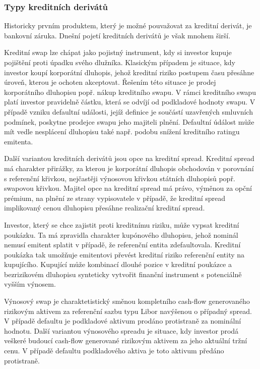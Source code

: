 \documentclass[a4paper]{book}
\begin{document}
\subsubsection{Typy kreditních derivátů}

Historicky prvním produktem, který je možné pouvažovat za kreditní derivát, je bankovní záruka. Dnešní pojetí kreditních derivátů je však mnohem širší.

Kreditní swap lze chápat jako pojistný instrument, kdy si investor kupuje pojištění proti úpadku svého dlužníka. Klasickým případem je situace, kdy investor koupí korporátní dluhopis, jehož kreditní riziko postupem času přesáhne úroveň, kterou je ochoten akceptovat. Řešením této situace je prodej korporátního dluhopisu popř. nákup kreditního swapu. V rámci kreditního swapu platí investor pravidelně částku, která se odvíjí od podkladové hodnoty swapu. V případě vzniku defaultní události, jejíž definice je součástí uzavřených smluvních podmínek, poskytne prodejce swapu jeho majiteli plnění. Defaultní údálost může mít vedle nesplácení dluhopisu také např. podobu snížení kreditního ratingu emitenta.

Další variantou kreditních derivátů jsou opce na kreditní spread. Kreditní spread má charakter přirážky, za kterou je korporátní dluhopis obchodován v porovnání s referenční křivkou, nejčastěji výnosovou křivkou státních dluhopisů popř. swapovou křivkou. Majitel opce na kreditní spread má právo, výměnou za opční prémium, na plnění ze strany vypisovatele v případě, že kreditní spread implikovaný cenou dluhopisu přesáhne realizační kreditní spread.

Investor, který se chce zajistit proti kreditnímu riziku, může vypsat kreditní poukázku. Ta má zpravidla charakter kupónového dluhopisu, jehož nominál nemusí emitent splatit v případě, že referenční entita zdefaultovala. Kreditní poukázka tak umožňuje emitentovi převést kreditní riziko referenční entity na kupujícího. Kupující může kombinací dlouhé pozice v kreditní poukázce a bezrizikovém dluhopisu synteticky vytvořit finanční instrument s potenciálně vyšším výnosem.

Výnosový swap je charaktetistický směnou kompletního cash-flow generovaného rizikovým aktivem za referenční sazbu typu Libor navýšenou o případný spread. V případě defaultu je podkladové aktivum prodáno protistraně za nominální hodnotu. Další variantou výnosového spreadu je situace, kdy investor prodá veškeré budoucí cash-flow generované rizikovým aktivem za jeho aktuální tržní cenu. V případě defaultu podkladového aktiva je toto aktivum předáno protistraně.
\end{document}
